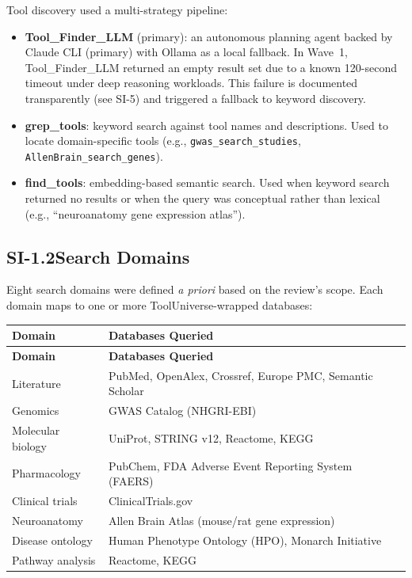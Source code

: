 \noindent
Tool discovery used a multi-strategy pipeline:

\begin{itemize}[nosep]
  \item \textbf{Tool\_Finder\_LLM} (primary): an autonomous planning agent
        backed by Claude CLI (primary) with Ollama as a local fallback.
        In Wave~1, Tool\_Finder\_LLM returned an empty result set due to a
        known 120-second timeout under deep reasoning workloads.  This failure
        is documented transparently (see SI-5) and triggered a fallback to
        keyword discovery.
  \item \textbf{grep\_tools}: keyword search against tool names and
        descriptions.  Used to locate domain-specific tools (e.g.,
        \texttt{gwas\_search\_studies}, \texttt{AllenBrain\_search\_genes}).
  \item \textbf{find\_tools}: embedding-based semantic search.  Used when
        keyword search returned no results or when the query was conceptual
        rather than lexical (e.g., ``neuroanatomy gene expression atlas'').
\end{itemize}

\subsection*{SI-1.2\quad Search Domains}

Eight search domains were defined \emph{a priori} based on the review's
scope.  Each domain maps to one or more ToolUniverse-wrapped databases:

\begin{longtable}{@{}p{3.8cm}p{9.8cm}@{}}
\toprule
\textbf{Domain} & \textbf{Databases Queried} \\
\midrule
\endfirsthead
\toprule
\textbf{Domain} & \textbf{Databases Queried} \\
\midrule
\endhead
\bottomrule
\endlastfoot
Literature &
  PubMed, OpenAlex, Crossref, Europe PMC, Semantic Scholar \\
Genomics &
  GWAS Catalog (NHGRI-EBI) \\
Molecular biology &
  UniProt, STRING v12, Reactome, KEGG \\
Pharmacology &
  PubChem, FDA Adverse Event Reporting System (FAERS) \\
Clinical trials &
  ClinicalTrials.gov \\
Neuroanatomy &
  Allen Brain Atlas (mouse/rat gene expression) \\
Disease ontology &
  Human Phenotype Ontology (HPO), Monarch Initiative \\
Pathway analysis &
  Reactome, KEGG \\
\end{longtable}

